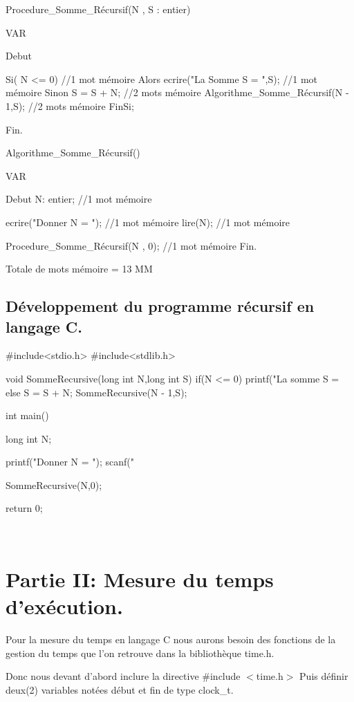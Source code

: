 \documentclass[•]{article}
\begin{document}
\begin{sql}
Procedure_Somme_Récursif(N , S : entier)
 
 VAR
 
 Debut									
 
	Si( N <= 0)										//1 mot mémoire
		Alors ecrire("La Somme S = ",S);			//1 mot mémoire
		Sinon   S = S + N;							//2 mots mémoire
				Algorithme_Somme_Récursif(N - 1,S);	//2 mots mémoire
	FinSi;
	
 Fin.
 
 
 Algorithme_Somme_Récursif()
 
 VAR
 
 Debut
	N: entier;										//1 mot mémoire

    ecrire("Donner N = ");							//1 mot mémoire
	lire(N);										//1 mot mémoire

	Procedure_Somme_Récursif(N , 0);				//1 mot mémoire
 Fin.
\end{sql}
\textrm{Totale de mots mémoire = 13 MM}

\subsection{Développement du programme récursif en langage C.}
\begin{sql}
 #include<stdio.h>
 #include<stdlib.h>

 void SommeRecursive(long int N,long int S)
 {
	if(N <= 0)
	{
		printf("La somme S = %
	}else
	{
		S = S + N;
		SommeRecursive(N - 1,S);
	}
 }


int main()
{
    long int N;

    printf("Donner N = ");
	scanf("%

	SommeRecursive(N,0);

	return 0;
}

\end{sql}



\textrm{  }
\\

\section{Partie II: Mesure du temps d'exécution.}
\textrm{
Pour la mesure du temps en langage C nous aurons besoin des fonctions de la gestion du temps que l'on retrouve dans la bibliothèque time.h.}

\textrm{Donc nous devant d'abord inclure la directive \#include $<$time.h$>$
Puis définir deux(2) variables notées début et fin de type clock\_t.}
\end{document}
